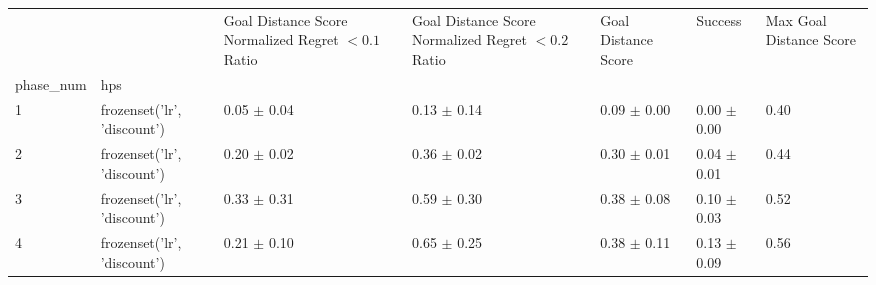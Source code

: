 \begin{tabular}{lllllll}
\toprule
 &  & Goal Distance Score Normalized Regret $< 0.1$ Ratio & Goal Distance Score Normalized Regret $< 0.2$ Ratio & Goal Distance Score & Success & Max Goal Distance Score \\
phase_num & hps &  &  &  &  &  \\
\midrule
1 & frozenset({'lr', 'discount'}) & 0.05 $\pm$ 0.04 & 0.13 $\pm$ 0.14 & 0.09 $\pm$ 0.00 & 0.00 $\pm$ 0.00 & 0.40 \\
\cline{1-7}
2 & frozenset({'lr', 'discount'}) & 0.20 $\pm$ 0.02 & 0.36 $\pm$ 0.02 & 0.30 $\pm$ 0.01 & 0.04 $\pm$ 0.01 & 0.44 \\
\cline{1-7}
3 & frozenset({'lr', 'discount'}) & 0.33 $\pm$ 0.31 & 0.59 $\pm$ 0.30 & 0.38 $\pm$ 0.08 & 0.10 $\pm$ 0.03 & 0.52 \\
\cline{1-7}
4 & frozenset({'lr', 'discount'}) & 0.21 $\pm$ 0.10 & 0.65 $\pm$ 0.25 & 0.38 $\pm$ 0.11 & 0.13 $\pm$ 0.09 & 0.56 \\
\cline{1-7}
\bottomrule
\end{tabular}
